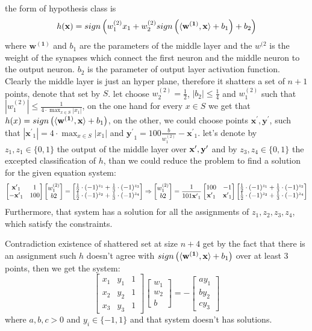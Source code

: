 \documentclass{article}
\begin{document}
the form of hypothesis class is \[ h( \mathbf{x} ) = sign\left( w^{(2)}_{1}x_1 +w^{(2)}_{2} sign\left(   \braket{ \mathbf{w^{(1)}},\mathbf{x} } + b_1 \right) + b_2 \right)  \] where \( \mathbf{w^{(1)} } \) and \( b_1 \) are the parameters of the middle layer and the \( w^{(2} \) is the weight of the synapses which connect the first neuron and the middle neuron to the output neuron. \( b_2 \) is the parameter of output layer activation function. Clearly the middle layer is just an hyper plane, therefore it shatters a set of \( n + 1 \) points, denote that set by \( S \). 
let choose \( w^{(2)}_2= \frac{1}{2} \), \(|b_2| \le \frac{1}{4} \) and \( w^{(2)}_1 \) such that \( |w^{(2)}_1| \le \frac{1}{4\cdot \max_{x \in S} {|x_1|}} \), on the one hand for every \( x \in  S\) we get that \( h(x) = sign\left(   \braket{\mathbf{w^{(1)}},\mathbf{x} } + b_1 \right) \), on the other, we could choose points \( \mathbf{x^{\prime}}, \mathbf{y^{\prime}}\), such that \( |\mathbf{x^{\prime}}_1| = 4 \cdot \max_{x \in S} {|x_1|} \) and \( \mathbf{y^{\prime}}_1 = 100\frac{b}{w^{(2)}_1}- \mathbf{x^{\prime}}_1\). let's denote by \( z_1 , z_1 \in \{0,1\} \) the output of the middle layer over \( \mathbf{x^{\prime}}, \mathbf{y^{\prime}} \) and by \( z_3, z_4 \in \{0,1\} \) the excepted classification of \( h\), than we could reduce the problem to find a solution for the given equation system:
\[
\begin{bmatrix}
\mathbf{x^{\prime}}_1 & 1 \\
-\mathbf{x^{\prime}}_1 & 100 
\end{bmatrix}
\begin{bmatrix}
w^{(2)}_1 \\
b2 
\end{bmatrix}
= 
\begin{bmatrix} \frac{1}{2}\cdot(-1)^{z_1} + \frac{1}{3}\cdot(-1) ^{z_3} \\ \frac{1}{2}\cdot(-1)^{z_2} + \frac{1}{3}\cdot(-1) ^{z_4} \end{bmatrix} \Rightarrow
\begin{bmatrix}
w^{(2)}_1 \\
b2 
\end{bmatrix} = \frac{1}{101\mathbf{x^{\prime}}_1} 
 \begin{bmatrix}
100 & -1 \\
\mathbf{x^{\prime}}_1 & \mathbf{x^{\prime}}_1 
\end{bmatrix}
\begin{bmatrix} \frac{1}{2}\cdot(-1)^{z_1} + \frac{1}{3}\cdot(-1) ^{z_3} \\ \frac{1}{2}\cdot(-1)^{z_2} + \frac{1}{3}\cdot(-1) ^{z_4} \end{bmatrix}
\]
Furthermore, that system has a solution for all the assignments of \( z_1, z_2, z_3, z_4\), which satisfy the constraints. 

Contradiction existence of shattered set at size \( n + 4 \) get by the fact that there is an assignment such \( h \) doesn't agree with \( sign\left(   \braket{ \mathbf{w^{(1)}},\mathbf{x} } + b_1 \right) \) over at least \(3\) points, then we get the system: \[
 \begin{bmatrix}
x_1 & y_1 & 1 \\
x_2 & y_2 & 1 \\
x_3 & y_3 & 1
\end{bmatrix} 
\begin{bmatrix}
w_1 \\ 
w_2 \\ 
b
\end{bmatrix} = - 
\begin{bmatrix}
ay_1 \\ 
by_2 \\ 
cy_3
\end{bmatrix} \] where \(a,b,c > 0 \) and \( y_i \in \{ -1, 1\} \) and that system doesn't has solutions. 
\end{document}
